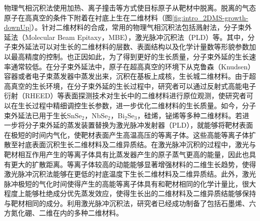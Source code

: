     物理气相沉积法使用加热、离子撞击等方式使目标原子从靶材中脱离。脱离的气态原子在高真空的条件下附着在衬底上生在二维材料（图\ref{fig:intro_2DMS-growth-downUp}）。针对二维材料的合成，常用的物理气相沉积法包括溅射法，分子束外延法（Molecular Beam Epitaxy，MBE），激光脉冲沉积法（PLD）等。其中，分子束外延法可以对生长的二维材料的层数、表面结构以及化学计量数等形貌参数加以最高精度的控制。也正因如此，为了得到更好的生长质量，分子束外延的生长速率通常较低。在分子束外延法中，原子在超高真空的环境下从克鲁森（Knudsen）容器或者电子束蒸发器中蒸发出来，沉积在基板上成核，生长城二维材料。由于超高真空的生长环境，在分子束外延的生长过程中，研究者可以通过反射式高能电子衍射（RHEED）等表面探测技术对生长中的二维材料进行原位观测，使研究者可以在生长过程中精细调控生长参数，进一步优化二维材料的生长质量。如今，分子束外延法已用于生长SnSe$_2$，NbSe$_2$，Bi$_2$Se$_3$，硅烯，铋烯等多种二维材料。若进一步将分子束外延的蒸发装置替换为激光脉冲发射器（PLD），就能够将靶材表面在极短的时间内气化，使靶材表面产生高温高压的等离子体。这些高能等离子体扩散至衬底表面沉积生长二维材料及二维异质结。在激光脉冲沉积的过程中，激光与靶材相互作用产生的等离子体具有比蒸发器产生的原子蒸气更高的能量，因此也具有更大的扩散距离。等离子体较高的动能能够显著增强材料的二维生长趋势，使得激光脉冲沉积法能够在更低的衬底温度下生长二维材料及二维异质结。此外，激光脉冲极短的气化时间使得产生的高能等离子体具有和靶材相同的化学计量比，很大程度上能够杜绝成分优先蒸发效应，使得生长出的二维材料及二维异质结能够保持与靶材相同的成分。利用激光脉冲沉积法，研究者已经成功制备了包括石墨烯、六方氮化硼、二维在内的多种二维材料。

